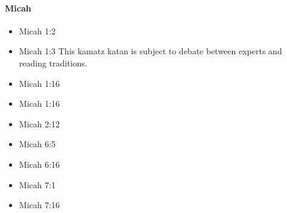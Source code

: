 \documentclass[14pt]{article}
\begin{document}
															\paragraph{Micah}
														\begin{multicols}{2}\begin{itemize}
																
																\item Micah 1:2
																
																\item Micah 1:3 This kamatz katan is subject to debate between experts and reading traditions.
																
																\item Micah 1:16
																
																\item Micah 1:16
																
																\item Micah 2:12
																
																\item Micah 6:5
																
																\item Micah 6:16
																
																\item Micah 7:1
																
																\item Micah 7:16
																
																								\end{itemize}\end{multicols}
\end{document}
